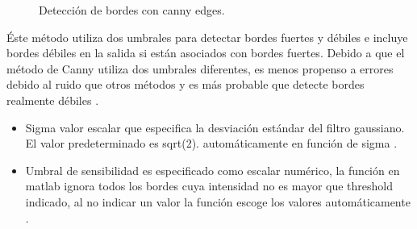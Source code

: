 \documentclass[a4paper, 11pt]{article}
\begin{document}
\begin{itemize}
  \begin{figure}[ht]%
    \centering
    \qquad
    \caption{Detección de bordes con canny edges.}%
    \label{canny}%
  \end{figure}
  
\end{itemize}

Éste método utiliza dos umbrales para detectar bordes fuertes y débiles e incluye bordes débiles en la salida si están asociados con bordes fuertes. Debido a que el método de Canny utiliza dos umbrales diferentes, es menos propenso a errores debido al ruido que otros métodos y es más probable que detecte bordes realmente débiles \cite{canny}.

\begin{itemize}
\item Sigma valor escalar que especifica la desviación estándar del filtro gaussiano. El valor predeterminado es sqrt(2).  automáticamente en función de sigma \cite{canny}.
\item Umbral de sensibilidad es especificado como escalar numérico, la función en matlab ignora todos los bordes cuya intensidad no es mayor que threshold indicado, al no indicar un valor la función escoge los valores automáticamente \cite{canny}.
\end{itemize}
\end{document}
